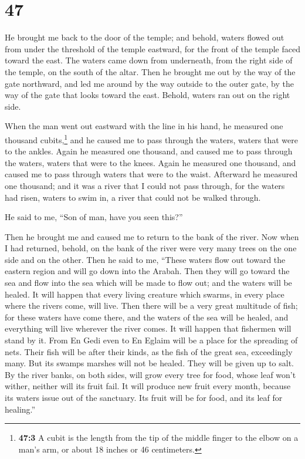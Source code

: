 \hypertarget{section-45}{%
\section{47}\label{section-45}}

 He brought me back to the door of the temple; and behold,
waters flowed out from under the threshold of the temple eastward, for
the front of the temple faced toward the east. The waters came down from
underneath, from the right side of the temple, on the south of the
altar.  Then he brought me out by the way of the gate
northward, and led me around by the way outside to the outer gate, by
the way of the gate that looks toward the east. Behold, waters ran out
on the right side.

 When the man went out eastward with the line in his hand,
he measured one thousand cubits,\footnote{\textbf{47:3} A cubit is the
  length from the tip of the middle finger to the elbow on a man's arm,
  or about 18 inches or 46 centimeters.} and he caused me to pass
through the waters, waters that were to the ankles.  Again
he measured one thousand, and caused me to pass through the waters,
waters that were to the knees. Again he measured one thousand, and
caused me to pass through waters that were to the waist. 
Afterward he measured one thousand; and it was a river that I could not
pass through, for the waters had risen, waters to swim in, a river that
could not be walked through.

 He said to me, ``Son of man, have you seen this?''

Then he brought me and caused me to return to the bank of the river.
 Now when I had returned, behold, on the bank of the river
were very many trees on the one side and on the other. 
Then he said to me, ``These waters flow out toward the eastern region
and will go down into the Arabah. Then they will go toward the sea and
flow into the sea which will be made to flow out; and the waters will be
healed.  It will happen that every living creature which
swarms, in every place where the rivers come, will live. Then there will
be a very great multitude of fish; for these waters have come there, and
the waters of the sea will be healed, and everything will live wherever
the river comes.  It will happen that fishermen will
stand by it. From En Gedi even to En Eglaim will be a place for the
spreading of nets. Their fish will be after their kinds, as the fish of
the great sea, exceedingly many.  But its swamps marshes
will not be healed. They will be given up to salt.  By
the river banks, on both sides, will grow every tree for food, whose
leaf won't wither, neither will its fruit fail. It will produce new
fruit every month, because its waters issue out of the sanctuary. Its
fruit will be for food, and its leaf for healing.''

